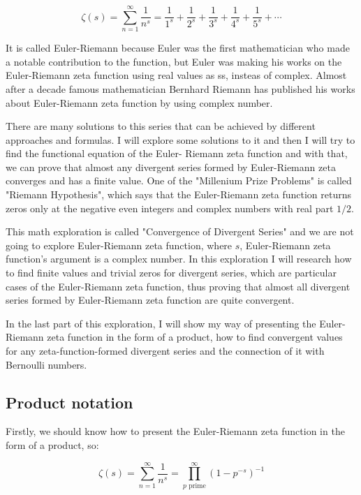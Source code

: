 \documentclass[11pt]{article}
\begin{document}
\begin{equation*}
  \zeta(s)=\sum_{n=1}^{\infty} \frac{1}{n^s}=\frac{1}{1^s}+\frac{1}{2^s}+\frac{1}{3^s}+
  \frac{1}{4^s}+\frac{1}{5^s}+\cdots
  \end{equation*}

It is called Euler-Riemann because Euler was the first mathematician who made a
notable contribution to the function, but Euler was making his works on the
Euler-Riemann zeta function using real values as ss, insteas of complex. Almost
after a decade famous mathematician Bernhard Riemann has published his works
about Euler-Riemann zeta function by using complex number.

There are many solutions to this series that can be achieved by different
approaches and formulas. I will explore some solutions to it and then I will try
to find the functional equation of the Euler- Riemann zeta function and with
that, we can prove that almost any divergent series formed by Euler-Riemann zeta
converges and has a finite value. One of the "Millenium Prize Problems" is
called "Riemann Hypothesis", which says that the Euler-Riemann zeta function
returns zeros only at the negative even integers and complex numbers with real
part \(1/2\).  

This math exploration is called "Convergence of Divergent Series" and we are not
going to explore Euler-Riemann zeta function, where \(s\), Euler-Riemann zeta
function's argument is a complex number. In this exploration I will research how
to find finite values and trivial zeros for divergent series, which are
particular cases of the Euler-Riemann zeta function, thus proving that almost
all divergent series formed by Euler-Riemann zeta function are quite
convergent. 

In the last part of this exploration, I will show my way of presenting the
Euler-Riemann zeta function in the form of a product, how to find convergent
values for any zeta-function-formed divergent series and the connection of it
with Bernoulli numbers. 

\subsection{Product notation}
\label{sec:orgc0b727b}

Firstly, we should know how to present the Euler-Riemann zeta function in the
form of a product, so:

\begin{equation}
  \zeta(s)=\sum_{n=1}^{\infty} \frac{1}{n^s}=\prod_{p \text{ prime}}^{\infty} (1-p^{-s})^{-1}
\end{equation}
\end{document}

